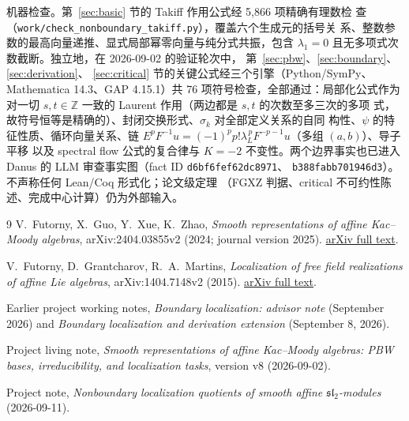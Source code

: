 \documentclass[UTF8,11pt]{ctexart}
\newcommand{\Z}{\mathbb Z}
\theoremstyle{definition}
\begin{document}
机器检查。第~\ref{sec:basic} 节的 Takiff 作用公式经 5,866 项精确有理数检
查（\texttt{work/check\_nonboundary\_takiff.py}），覆盖六个生成元的括号关
系、整数参数的最高向量递推、显式局部幂零向量与纯分式共振，包含
\(\lambda_1=0\) 且无多项式次数截断。独立地，在 2026-09-02 的验证轮次中，
第~\ref{sec:pbw}、\ref{sec:boundary}、\ref{sec:derivation}、
\ref{sec:critical} 节的关键公式经三个引擎（Python/SymPy、Mathematica
14.3、GAP 4.15.1）共 76 项符号检查，全部通过：局部化公式作为对一切
\(s,t\in\Z\) 一致的 Laurent 作用（两边都是 \(s,t\) 的次数至多三次的多项
式，故符号恒等是精确的）、封闭交换形式、\(\sigma_k\) 对全部定义关系的自同
构性、\(\psi\) 的特征性质、循环向量关系、链
\(E^pF^{-1}u=(-1)^pp!\lambda_L^{\,p}F^{-p-1}u\)（多组 \((a,b)\)）、导子平移
以及 spectral flow 公式的复合律与 \(K=-2\) 不变性。两个边界事实也已进入
Danus 的 LLM 审查事实图（fact ID \texttt{d6bf6fef62dc8971}、
\texttt{b388fabb701946d3}）。不声称任何 Lean/Coq 形式化；论文级定理
（FGXZ 判据、critical 不可约性陈述、完成中心计算）仍为外部输入。

\begingroup
\raggedright
\begin{thebibliography}{9}
V.~Futorny, X.~Guo, Y.~Xue, K.~Zhao,
\emph{Smooth representations of affine Kac--Moody algebras},
arXiv:2404.03855v2 (2024; journal version 2025).
\href{https://arxiv.org/html/2404.03855v2}{arXiv full text}.

V.~Futorny, D.~Grantcharov, R.~A.~Martins,
\emph{Localization of free field realizations of affine Lie algebras},
arXiv:1404.7148v2 (2015).
\href{https://arxiv.org/html/1404.7148v2}{arXiv full text}.

Earlier project working notes, \emph{Boundary localization: advisor note}
(September 2026) and \emph{Boundary localization and derivation extension}
(September 8, 2026).

Project living note, \emph{Smooth representations of affine Kac--Moody
algebras: PBW bases, irreducibility, and localization tasks},
version v8 (2026-09-02).

Project note, \emph{Nonboundary localization quotients of smooth affine
\(\mathfrak{sl}_2\)-modules} (2026-09-11).
\end{thebibliography}
\endgroup
\end{document}
